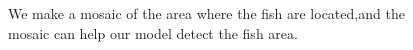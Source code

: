 \documentclass[conference]{IEEEtran}
\begin{document}
\begin{figure}[!ht]
\centering
{}
  \hspace{0.15in}
  \hspace{0.15in}
  \caption{We make a mosaic of the area where the fish are located,and the mosaic can help our model detect the fish area.}
\end{figure}
\end{document}
